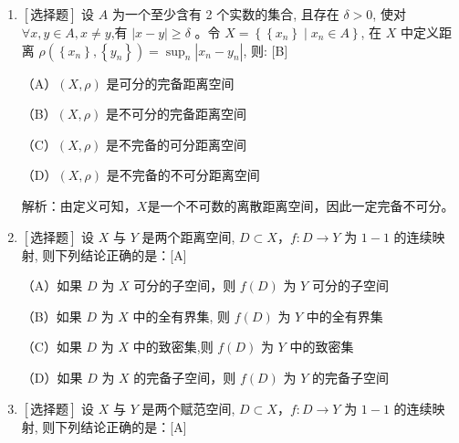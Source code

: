 \documentclass{article}
\begin{document}
\begin{enumerate}
    \item $\left[\textbf{选择题}\right]$ 设 $A$ 为一个至少含有 2 个实数的集合, 且存在 $\delta>0$, 使对 $\forall x, y \in A, x \neq y$,有 $|x-y| \geq \delta$ 。令 $X=\left\{\left\{x_n\right\} \mid x_n \in A\right\}$, 在 $X$ 中定义距离 $\rho\left(\left\{x_n\right\},\left\{y_n\right\}\right)=\sup _n\left|x_n-y_n\right|$, 则: \hfill [B]

    \begin{minipage}[t]{0.45\linewidth}
    （A）$(X, \rho)$ 是可分的完备距离空间
    \end{minipage}
    \hfill
    \begin{minipage}[t]{0.45\linewidth}
    （B）$(X, \rho)$ 是不可分的完备距离空间
    \end{minipage}
    \begin{minipage}[t]{0.45\linewidth}
    （C）$(X, \rho)$ 是不完备的可分距离空间
    \end{minipage}
    \hfill
    \begin{minipage}[t]{0.45\linewidth}
    （D）$(X, \rho)$ 是不完备的不可分距离空间
    \end{minipage}

    解析：由定义可知，$X$是一个不可数的离散距离空间，因此一定完备不可分。

    \item $\left[\textbf{选择题}\right]$ 设 $X$ 与 $Y$ 是两个距离空间, $D \subset X$，$f: D \rightarrow Y$ 为 $1-1$ 的连续映射, 则下列结论正确的是：\hfill [A]

    \begin{minipage}[t]{0.45\linewidth}
    （A）如果 $D$ 为 $X$ 可分的子空间，则 $f(D)$ 为 $Y$ 可分的子空间
    \end{minipage}
    \hfill
    \begin{minipage}[t]{0.45\linewidth}
    （B）如果 $D$ 为 $X$ 中的全有界集, 则 $f(D)$ 为 $Y$ 中的全有界集
    \end{minipage}
    \begin{minipage}[t]{0.45\linewidth}
    （C）如果 $D$ 为 $X$ 中的致密集,则 $f(D)$ 为 $Y$ 中的致密集
    \end{minipage}
    \hfill
    \begin{minipage}[t]{0.45\linewidth}
    （D）如果 $D$ 为 $X$ 的完备子空间，则 $f(D)$ 为 $Y$ 的完备子空间
    \end{minipage}

    \item $\left[\textbf{选择题}\right]$ 设 $X$ 与 $Y$ 是两个赋范空间, $D \subset X$，$f: D \rightarrow Y$ 为 $1-1$ 的连续映射, 则下列结论正确的是：\hfill [A]


\end{enumerate}
\end{document}
